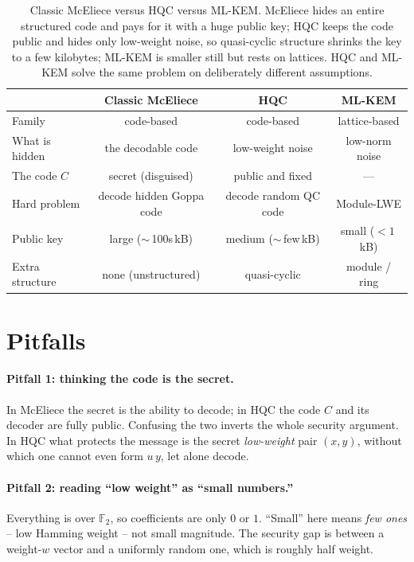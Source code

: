 \begin{table}[H]
\centering
\begin{tabular}{lccc}
\toprule
 & Classic McEliece & HQC & ML-KEM \\
\midrule
Family        & code-based        & code-based            & lattice-based \\
What is hidden & the decodable code & low-weight noise      & low-norm noise \\
The code $C$   & secret (disguised) & public and fixed      & --- \\
Hard problem   & decode hidden Goppa code & decode random QC code & Module-LWE \\
Public key     & large ($\sim$\,100s\,kB) & medium ($\sim$\,few\,kB) & small ($<1$\,kB) \\
Extra structure & none (unstructured)  & quasi-cyclic          & module / ring \\
\bottomrule
\end{tabular}
\caption{Classic McEliece versus HQC versus ML-KEM. McEliece hides an entire structured code and pays for it with a huge public key; HQC keeps the code public and hides only low-weight noise, so quasi-cyclic structure shrinks the key to a few kilobytes; ML-KEM is smaller still but rests on lattices. HQC and ML-KEM solve the same problem on deliberately different assumptions.}
\label{tab:hqc-comparison}
\end{table}

\section{Pitfalls}

\paragraph{Pitfall 1: thinking the code is the secret.} In McEliece the secret is the ability to decode; in HQC the code $C$ and its decoder are fully public. Confusing the two inverts the whole security argument. In HQC what protects the message is the secret \emph{low-weight} pair $(x,y)$, without which one cannot even form $u\,y$, let alone decode.

\paragraph{Pitfall 2: reading ``low weight'' as ``small numbers.''} Everything is over $\mathbb{F}_2$, so coefficients are only $0$ or $1$. ``Small'' here means \emph{few ones} -- low Hamming weight -- not small magnitude. The security gap is between a weight-$w$ vector and a uniformly random one, which is roughly half weight.


